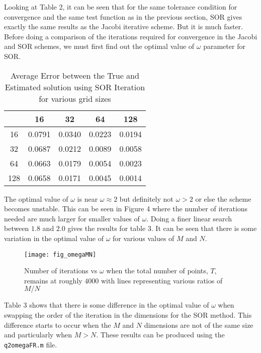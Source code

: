 \documentclass{article}
\begin{document}
\begin{enumerate}
    Looking at Table 2, it can be seen that for the same tolerance condition for convergence and the same test function as in the previous section, SOR gives exactly the same results as the Jacobi iterative scheme. But it is much faster. Before doing a comparison of the iterations required for convergence in the Jacobi and SOR schemes, we must first find out the optimal value of $\omega$ parameter for SOR. 
	\begin{table} [h!]
		\centering 
		\begin{tabular}{|c|cccc|} \hline
		 \diagbox{M}{N} & 16 & 32 & 64 & 128 \\
		\hline
		     16 & 0.0791  &  0.0340  &  0.0223  &  0.0194 \\
    32 & 0.0687  &  0.0212  &  0.0089  &  0.0058 \\ 
    64 & 0.0663  &  0.0179   & 0.0054   & 0.0023 \\
    128 & 0.0658  &  0.0171   & 0.0045  &  0.0014 \\
		 \hline
		\end{tabular}
		\caption{Average Error between the True and Estimated solution using SOR Iteration for various grid sizes}
		\label{tab:2}
	\end{table}

	The optimal value of $\omega $ is near $\omega \approx 2$ but definitely not $\omega > 2$ or else the scheme becomes unstable. This can be seen in Figure 4 where the number of iterations needed are much larger for smaller values of $\omega$. Doing a finer linear search between $1.8$ and $2.0$ gives the results for table 3. It can be seen that there is some variation in the optimal value of $\omega$ for various values of $M$ and $N$.
	
	\begin{figure}[h!]
		\centering
		\texttt{[image: fig\_omegaMN]}
		\caption{Number of iterations vs $\omega$ when the total number of points, $T$, remains at roughly $4000$ with lines representing various ratios of $M/N$}
	\end{figure}
	 
	Table 3 shows that there is some difference in the optimal value of $\omega$ when swapping the order of the iteration in the dimensions for the SOR method. This difference starts to occur when the $M$ and $N$ dimensions are not of the same size and particularly when $M>N$. These results can be produced using the \texttt{q2omegaFR.m} file.
	 

\end{enumerate}
\end{document}
